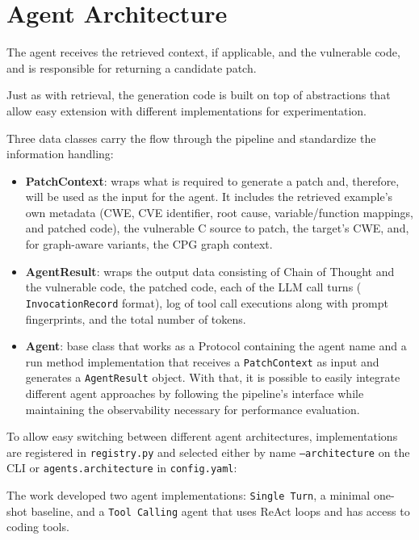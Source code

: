 \section{Agent Architecture}\label{section:agent-architecture}

The agent receives the retrieved context, if applicable, and the vulnerable code, and is responsible for returning a candidate patch.

Just as with retrieval, the generation code is built on top of abstractions that allow easy extension with different implementations for experimentation.


Three data classes carry the flow through the pipeline and standardize the information handling:

\begin{itemize}
  \item \textbf{PatchContext}: wraps what is required to generate a patch and, therefore, will be used as the input for the agent. It includes the retrieved example's own metadata (CWE, CVE identifier, root cause, variable/function mappings, and patched code), the vulnerable C source to patch, the target's CWE, and, for graph-aware variants, the CPG graph context.
  \item \textbf{AgentResult}: wraps the output data consisting of Chain of Thought and the vulnerable code, the patched code, each of the LLM call turns ( \texttt{InvocationRecord} format), log of tool call executions along with prompt fingerprints, and the total number of tokens.
\item \textbf{Agent}: base class that works as a Protocol containing the agent name and a run method implementation that receives a \texttt{PatchContext} as input and generates a \texttt{AgentResult} object. With that, it is possible to easily integrate different agent approaches by following the pipeline's interface while maintaining the observability necessary for performance evaluation.  
\end{itemize}


To allow easy switching between different agent architectures, implementations are registered in \texttt{registry.py} and selected either by name \texttt{--architecture} on the CLI or \texttt{agents.architecture} in \texttt{config.yaml}:

The work developed two agent implementations: \texttt{Single Turn}, a minimal one-shot baseline, and a \texttt{Tool Calling} agent that uses ReAct loops and has access to coding tools\cite{bouzenia2025repairagent}.

